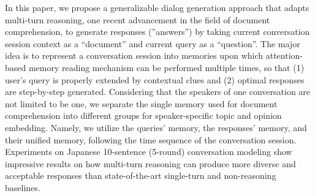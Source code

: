 In this paper, we propose a generalizable dialog generation approach that adapts multi-turn reasoning, one recent advancement in the field of document comprehension, to generate responses (''answers'') by taking current conversation session context as a ``document'' and current query as a ``question''. The major idea is to represent a conversation session into memories upon which attention-based memory reading mechanism can be performed multiple times, so that (1) user's query is properly extended by contextual clues and (2) optimal responses are step-by-step generated. Considering that the speakers of one conversation are not limited to be one, we separate the single memory used for document comprehension into different groups for speaker-specific topic and opinion embedding. Namely, we utilize the queries' memory, the responses' memory, and their unified memory, following the time sequence of the conversation session. Experiments on Japanese 10-sentence (5-round) conversation modeling show impressive results on how multi-turn reasoning can produce more diverse and acceptable responses than state-of-the-art single-turn and non-reasoning baselines.
